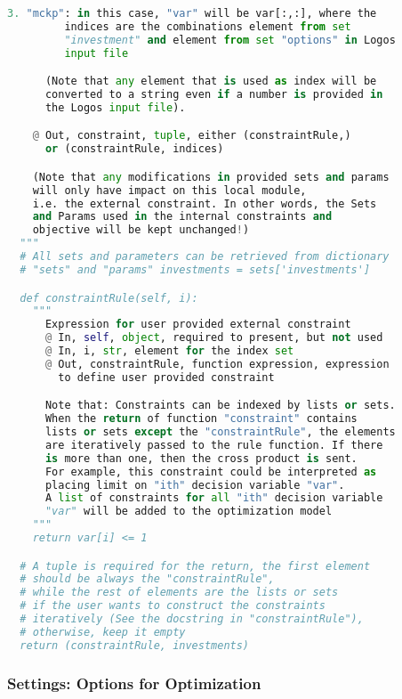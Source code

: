 \begin{lstlisting}[language=python]
      3. "mckp": in this case, "var" will be var[:,:], where the
         indices are the combinations element from set
         "investment" and element from set "options" in Logos
         input file

      (Note that any element that is used as index will be
      converted to a string even if a number is provided in
      the Logos input file).

    @ Out, constraint, tuple, either (constraintRule,)
      or (constraintRule, indices)

    (Note that any modifications in provided sets and params
    will only have impact on this local module,
    i.e. the external constraint. In other words, the Sets
    and Params used in the internal constraints and
    objective will be kept unchanged!)
  """
  # All sets and parameters can be retrieved from dictionary
  # "sets" and "params" investments = sets['investments']

  def constraintRule(self, i):
    """
      Expression for user provided external constraint
      @ In, self, object, required to present, but not used
      @ In, i, str, element for the index set
      @ Out, constraintRule, function expression, expression
        to define user provided constraint

      Note that: Constraints can be indexed by lists or sets.
      When the return of function "constraint" contains
      lists or sets except the "constraintRule", the elements
      are iteratively passed to the rule function. If there
      is more than one, then the cross product is sent.
      For example, this constraint could be interpreted as
      placing limit on "ith" decision variable "var".
      A list of constraints for all "ith" decision variable
      "var" will be added to the optimization model
    """
    return var[i] <= 1

  # A tuple is required for the return, the first element
  # should be always the "constraintRule",
  # while the rest of elements are the lists or sets
  # if the user wants to construct the constraints
  # iteratively (See the docstring in "constraintRule"),
  # otherwise, keep it empty
  return (constraintRule, investments)
\end{lstlisting}

%
\subsubsection{Settings: Options for Optimization}
\label{subsubsec:Settings}


